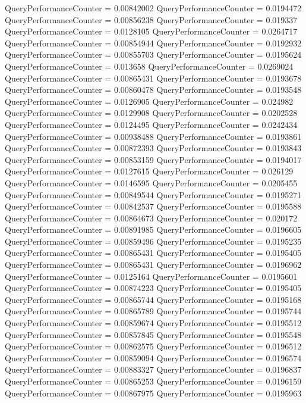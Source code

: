 \documentclass[9pt]{article}
\theoremstyle{plain}
\theoremstyle{definition}
\theoremstyle{remark}
\numberwithin{equation}{section}
\begin{document}
QueryPerformanceCounter  =  0.00842002
QueryPerformanceCounter  =  0.0194472
QueryPerformanceCounter  =  0.00856238
QueryPerformanceCounter  =  0.019337
QueryPerformanceCounter  =  0.0128105
QueryPerformanceCounter  =  0.0264717
QueryPerformanceCounter  =  0.00854944
QueryPerformanceCounter  =  0.0192932
QueryPerformanceCounter  =  0.00855703
QueryPerformanceCounter  =  0.0195624
QueryPerformanceCounter  =  0.013658
QueryPerformanceCounter  =  0.0269024
QueryPerformanceCounter  =  0.00865431
QueryPerformanceCounter  =  0.0193678
QueryPerformanceCounter  =  0.00860478
QueryPerformanceCounter  =  0.0193548
QueryPerformanceCounter  =  0.0126905
QueryPerformanceCounter  =  0.024982
QueryPerformanceCounter  =  0.0129908
QueryPerformanceCounter  =  0.0202528
QueryPerformanceCounter  =  0.0124495
QueryPerformanceCounter  =  0.0242434
QueryPerformanceCounter  =  0.00938488
QueryPerformanceCounter  =  0.0193861
QueryPerformanceCounter  =  0.00872393
QueryPerformanceCounter  =  0.0193843
QueryPerformanceCounter  =  0.00853159
QueryPerformanceCounter  =  0.0194017
QueryPerformanceCounter  =  0.0127615
QueryPerformanceCounter  =  0.026129
QueryPerformanceCounter  =  0.0146595
QueryPerformanceCounter  =  0.0205455
QueryPerformanceCounter  =  0.00849544
QueryPerformanceCounter  =  0.0195271
QueryPerformanceCounter  =  0.00842537
QueryPerformanceCounter  =  0.0195588
QueryPerformanceCounter  =  0.00864673
QueryPerformanceCounter  =  0.020172
QueryPerformanceCounter  =  0.00891985
QueryPerformanceCounter  =  0.0196605
QueryPerformanceCounter  =  0.00859496
QueryPerformanceCounter  =  0.0195235
QueryPerformanceCounter  =  0.00865431
QueryPerformanceCounter  =  0.0195405
QueryPerformanceCounter  =  0.00865431
QueryPerformanceCounter  =  0.0196962
QueryPerformanceCounter  =  0.0125164
QueryPerformanceCounter  =  0.0195601
QueryPerformanceCounter  =  0.00874223
QueryPerformanceCounter  =  0.0195405
QueryPerformanceCounter  =  0.00865744
QueryPerformanceCounter  =  0.0195168
QueryPerformanceCounter  =  0.00865789
QueryPerformanceCounter  =  0.0195744
QueryPerformanceCounter  =  0.00859674
QueryPerformanceCounter  =  0.0195512
QueryPerformanceCounter  =  0.00857845
QueryPerformanceCounter  =  0.0195548
QueryPerformanceCounter  =  0.00862575
QueryPerformanceCounter  =  0.0196512
QueryPerformanceCounter  =  0.00859094
QueryPerformanceCounter  =  0.0196574
QueryPerformanceCounter  =  0.00883327
QueryPerformanceCounter  =  0.0196837
QueryPerformanceCounter  =  0.00865253
QueryPerformanceCounter  =  0.0196159
QueryPerformanceCounter  =  0.00867975
QueryPerformanceCounter  =  0.0195963
\end{document}
